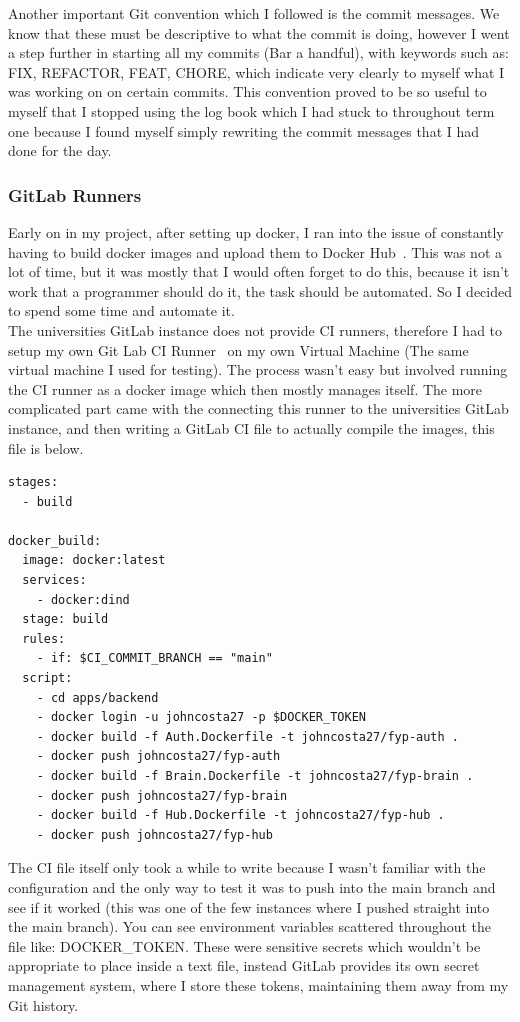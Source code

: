 \documentclass[titlepage]{article}
\begin{document}
Another important Git convention which I followed is the commit messages. We know that these must be descriptive to what the commit is doing, however I went a step further in starting all my commits (Bar a handful), with keywords such as: FIX, REFACTOR, FEAT, CHORE, which indicate very clearly to myself what I was working on on certain commits. This convention proved to be so useful to myself that I stopped using the log book which I had stuck to throughout term one because I found myself simply rewriting the commit messages that I had done for the day. 

\pagebreak
\subsubsection{GitLab Runners}
Early on in my project, after setting up docker, I ran into the issue of constantly having to build docker images and upload them to Docker Hub~\cite{docker_hub}. This was not a lot of time, but it was mostly that I would often forget to do this, because it isn't work that a programmer should do it, the task should be automated. So I decided to spend some time and automate it. \\

The universities GitLab instance does not provide CI runners, therefore I had to setup my own Git Lab CI Runner~\cite{gitlab_runner} on my own Virtual Machine (The same virtual machine I used for testing). The process wasn't easy but involved running the CI runner as a docker image which then mostly manages itself. The more complicated part came with the connecting this runner to the universities GitLab instance, and then writing a GitLab CI file to actually compile the images, this file is below.

\begin{verbatim}
stages:
  - build

docker_build:
  image: docker:latest
  services:
    - docker:dind
  stage: build
  rules:
    - if: $CI_COMMIT_BRANCH == "main"
  script:
    - cd apps/backend
    - docker login -u johncosta27 -p $DOCKER_TOKEN
    - docker build -f Auth.Dockerfile -t johncosta27/fyp-auth .
    - docker push johncosta27/fyp-auth
    - docker build -f Brain.Dockerfile -t johncosta27/fyp-brain .
    - docker push johncosta27/fyp-brain
    - docker build -f Hub.Dockerfile -t johncosta27/fyp-hub .
    - docker push johncosta27/fyp-hub
\end{verbatim}

The CI file itself only took a while to write because I wasn't familiar with the configuration and the only way to test it was to push into the main branch and see if it worked (this was one of the few instances where I pushed straight into the main branch). You can see environment variables scattered throughout the file like: DOCKER\_TOKEN. These were sensitive secrets which wouldn't be appropriate to place inside a text file, instead GitLab provides its own secret management system, where I store these tokens, maintaining them away from my Git history. \\
\end{document}
